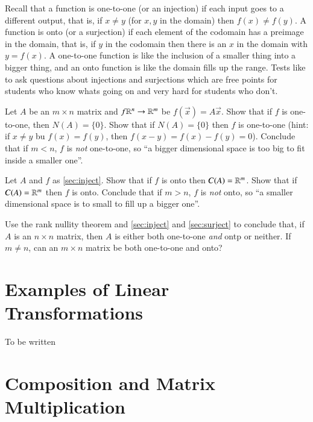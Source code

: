Recall that a function is one-to-one (or an injection) if each input goes to a different output, that is, if $x\ne y$ (for $x,y$ in the domain) then $f(x)\ne f(y)$.
A function is onto (or a surjection) if each element of the codomain has a preimage in the domain, that is, if $y$ in the codomain then there is an $x$ in the domain with $y=f(x)$.  
A one-to-one function is like the inclusion of a smaller thing into a bigger thing, and an onto function is like the domain fills up the range.  
Tests like to ask questions about injections and surjections which are free points for students who know whats going on and very hard for students who don't.  

\begin{ImpEasyEx}
  \label{sec:inject}
  Let $A$ be an $m\times n$ matrix and $f\mathbb{R}^n\to \mathbb{R}^m$ be $f(\vec{x}) = A\vec{x}$.
  Show that if $f$ is one-to-one, then $N(A)=\{0\}$.  
  Show that if $N(A)=\{0\}$ then $f$ is one-to-one (hint: if $x\ne y$ bu $f(x)=f(y)$, then $f(x-y)=f(x)-f(y)=0$).
  Conclude that if $m< n$, $f$ is \emph{not} one-to-one, so ``a bigger dimensional space is too big to fit inside a smaller one''.
\end{ImpEasyEx}

\begin{ImpEasyEx}
  \label{sec:surject}
  Let $A$ and $f$ as \ref{sec:inject}.  
  Show that if $f$ is onto then $C(A)=\mathbb{R}^m$.
  Show that if $C(A)=\mathbb{R}^m$ then $f$ is onto.  
  Conclude that if $m> n$, $f$ is \emph{not} onto, so ``a smaller dimensional space is to small to fill up a bigger one''.
\end{ImpEasyEx}

\begin{ImpEasyEx}
  \label{sec:surjandinj}
  Use the rank nullity theorem and \ref{sec:inject} and \ref{sec:surject} to conclude that, if $A$ is an $n\times n$ matrix, then $A$ is either both one-to-one \emph{and} ontp or neither.  
  If $m\ne n$, can an $m\times n$ matrix be both one-to-one and onto?
\end{ImpEasyEx}

\exersisesm

\section{Examples of Linear Transformations}

To be written

\exersisesn

\section{Composition and Matrix Multiplication}

